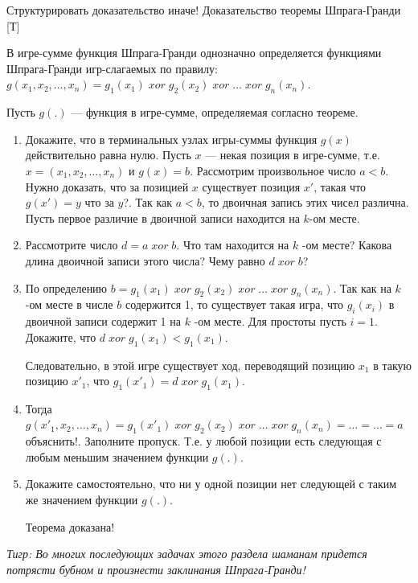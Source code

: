 \begin{problem} {\red  Структурировать доказательство иначе!}
 Доказательство теоремы Шпрага-Гранди [Т]\par
{}\par
В игре-сумме функция Шпрага-Гранди однозначно определяется функциями Шпрага-Гранди игр-слагаемых по правилу:  $g\left(x_{1},x_{2},\ldots,x_{n} \right)=g_{1} \left(x_{1} \right)\; xor\; g_{2} \left(x_{2} \right)\; xor\; \ldots \; xor\; g_{n} \left(x_{n} \right)$.
\par
Пусть  $g\left(.\right)$  — функция в игре-сумме, определяемая согласно теореме.
\begin{enumerate}
\item 	Докажите, что в терминальных узлах игры-суммы функция  $g\left(x\right)$  действительно равна нулю.
Пусть  $x$  — некая позиция в игре-сумме, т.е.  $x=\left(x_{1},x_{2},\ldots,x_{n} \right)$  и  $g\left(x\right)=b$. Рассмотрим произвольное число  $a<b$. Нужно доказать, что за позицией  $x$  существует позиция  $x'$, такая что  $g\left(x'\right)=y$ {\red что за $y$?}.
Так как  $a<b$, то двоичная запись этих чисел различна. Пусть первое различие в двоичной записи находится на  $k$-ом месте.\par
\item	Рассмотрите число  $d=a\; xor\; b$. Что там находится на  $k$ -ом месте? Какова длина двоичной записи этого числа? Чему равно  $d\; xor\; b$?
\item 	По определению  $b=g_{1} \left(x_{1} \right)\; xor\; g_{2} \left(x_{2} \right)\; xor\; \ldots \; xor\; g_{n} \left(x_{n} \right)$. Так как на  $k$ -ом месте в числе  $b$  содержится 1, то существует такая игра, что  $g_{i} \left(x_{i} \right)$  в двоичной записи содержит 1 на  $k$ -ом месте. Для простоты пусть  $i=1$. Докажите, что  $d\; xor\; g_{1} \left(x_{1} \right)<g_{1} \left(x_{1} \right)$.\par
Следовательно, в этой игре существует ход, переводящий позицию  $x_{1} $  в такую позицию $x'_{1} $, что  $g_{1} \left(x'_{1} \right)=d\; xor\; g_{1} \left(x_{1} \right)$.
\item	Тогда  $g\left(x'_{1},x_{2},\ldots,x_{n} \right)=g_{1} \left(x'_{1} \right)\; xor\; g_{2} \left(x_{2} \right)\; xor\; \ldots \; xor\; g_{n} \left(x_{n} \right)=\ldots =\ldots =a$ {\red объяснить!}. Заполните пропуск.
Т.е. у любой позиции есть следующая с любым меньшим значением функции  $g\left(.\right)$.\par
\item	Докажите самостоятельно, что ни у одной позиции нет следующей с таким же значением функции  $g\left(.\right)$.\par
Теорема доказана!\par
\end{enumerate}
{\it Тигр: Во многих последующих задачах этого раздела  шаманам придется потрясти бубном и произнести заклинания Шпрага-Гранди!}




\begin{sol}

\end{sol}
\end{problem}




